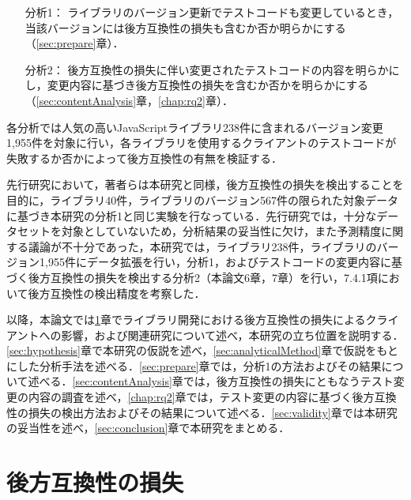 \documentclass[submit]{ipsj}
\begin{document}
\begin{itemize}
\item[分析1：] ライブラリのバージョン更新でテストコードも変更しているとき，当該バージョンには後方互換性の損失も含むか否か明らかにする（\ref{sec:prepare}章）．
\item[分析2：] 後方互換性の損失に伴い変更されたテストコードの内容を明らかにし，変更内容に基づき後方互換性の損失を含むか否かを明らかにする（\ref{sec:contentAnalysis}章，\ref{chap:rq2}章）．
\end{itemize}

各分析では人気の高いJavaScriptライブラリ238件に含まれるバージョン変更1,955件を対象に行い，各ライブラリを使用するクライアントのテストコードが失敗するか否かによって後方互換性の有無を検証する．

先行研究\cite{matsuda}において，著者らは本研究と同様，後方互換性の損失を検出することを目的に，ライブラリ40件，ライブラリのバージョン567件の限られた対象データに基づき本研究の分析1と同じ実験を行なっている．先行研究では，十分なデータセットを対象としていないため，分析結果の妥当性に欠け，また予測精度に関する議論が不十分であった，本研究では，ライブラリ238件，ライブラリのバージョン1,955件にデータ拡張を行い，分析1，およびテストコードの変更内容に基づく後方互換性の損失を検出する分析2（本論文6章，7章）を行い，7.4.1項において後方互換性の検出精度を考察した．

以降，本論文では\ref{sec:backward-compatibility}章でライブラリ開発における後方互換性の損失によるクライアントへの影響，および関連研究について述べ，本研究の立ち位置を説明する．\ref{sec:hypothesis}章で本研究の仮説を述べ，\ref{sec:analyticalMethod}章で仮説をもとにした分析手法を述べる．\ref{sec:prepare}章では，分析1の方法およびその結果について述べる．\ref{sec:contentAnalysis}章では，後方互換性の損失にともなうテスト変更の内容の調査を述べ，\ref{chap:rq2}章では，テスト変更の内容に基づく後方互換性の損失の検出方法およびその結果について述べる．\ref{sec:validity}章では本研究の妥当性を述べ，\ref{sec:conclusion}章で本研究をまとめる．

\section{後方互換性の損失}\label{sec:backward-compatibility}
\end{document}

